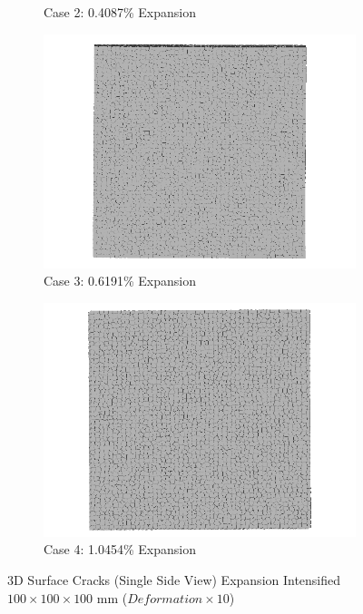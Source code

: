 \begin{figure}[ht!]
\begin{subfigure}{.5\textwidth}
    \caption{Case 2: 0.4087\% Expansion}
    \end{subfigure}%
    \begin{subfigure}{.5\textwidth}
      \centering
      \includegraphics[width=.8\linewidth]{Files/exp_3D/DEF/A30X-1C_3_3ds.png}
    \caption{Case 3: 0.6191\% Expansion}
    \end{subfigure}
    \begin{subfigure}{.5\textwidth}
      \centering
      \includegraphics[width=.8\linewidth]{Files/exp_3D/DEF/A30X-1C_4_3ds.png}
    \caption{Case 4: 1.0454\% Expansion}
    \end{subfigure}%

  \caption{3D Surface Cracks (Single Side View) Expansion Intensified $100 \times 100 \times 100$ mm ($Deformation \times 10$)}
  \label{fig:DEF_A30X-1C_3DssS}
\end{figure}

